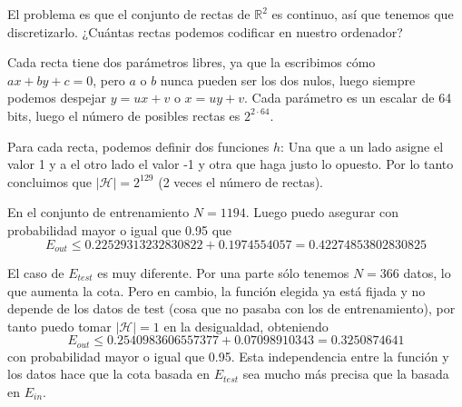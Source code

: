 \documentclass[a4]{article}
\begin{document}
El problema es que el conjunto de rectas de $\mathbb{R}^2$ es
continuo, así que tenemos que discretizarlo.
¿Cuántas rectas podemos codificar en nuestro ordenador?

Cada recta tiene dos parámetros libres, ya que la escribimos cómo $ax+by+c=0$,
pero $a$ o $b$ nunca pueden ser los dos nulos, luego siempre podemos despejar
$y=ux+v$ o $x=uy+v$. Cada parámetro es un escalar de 64 bits, luego el número de posibles
rectas es $2^{2\cdot 64}$.

Para cada recta, podemos definir dos funciones $h$:
Una que a un lado asigne el valor 1 y a el otro lado
el valor -1 y otra que haga justo lo opuesto. Por lo
tanto concluimos que $|\mathcal{H}|=2^{129}$ (2 veces el número de rectas).

En el conjunto de entrenamiento $N=1194$. Luego puedo asegurar con probabilidad mayor o igual que 0.95 que
\[E_{out}\leq 0.22529313232830822 + 0.1974554057 = 0.42274853802830825\]

El caso de $E_{test}$ es muy diferente. Por una parte sólo tenemos
$N=366$ datos, lo que aumenta la cota. Pero en cambio, la función elegida
ya está fijada y no depende de los datos de test (cosa que no pasaba con los
de entrenamiento), por tanto puedo tomar $|\mathcal{H}|=1$ en la desigualdad, obteniendo
\[E_{out}\leq 0.2540983606557377 + 0.07098910343 = 0.3250874641\]
con probabilidad mayor o igual que 0.95. Esta independencia entre la función y
los datos hace que la cota basada en $E_{test}$ sea mucho más precisa que la
basada en $E_{in}$.
\end{document}
